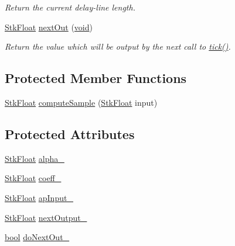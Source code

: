 \begin{DoxyCompactItemize}
\begin{DoxyCompactList}\small\item\em Return the current delay-\/line length. \end{DoxyCompactList}\item 
\hyperlink{namespace_nyq_a044fa20a706520a617bbbf458a7db7e4}{Stk\+Float} \hyperlink{class_nyq_1_1_delay_a_ab83c84ced52c64704f1b7806fef32fb1}{next\+Out} (\hyperlink{sound_8c_ae35f5844602719cf66324f4de2a658b3}{void})
\begin{DoxyCompactList}\small\item\em Return the value which will be output by the next call to \hyperlink{class_nyq_1_1_delay_a1ca7b9275f434e1f1b1808c2dc8b461f}{tick()}. \end{DoxyCompactList}\end{DoxyCompactItemize}
\subsection*{Protected Member Functions}
\begin{DoxyCompactItemize}
\item 
\hyperlink{namespace_nyq_a044fa20a706520a617bbbf458a7db7e4}{Stk\+Float} \hyperlink{class_nyq_1_1_delay_a_a5a666cb576c68f6265cb699cb567b8bf}{compute\+Sample} (\hyperlink{namespace_nyq_a044fa20a706520a617bbbf458a7db7e4}{Stk\+Float} input)
\end{DoxyCompactItemize}
\subsection*{Protected Attributes}
\begin{DoxyCompactItemize}
\item 
\hyperlink{namespace_nyq_a044fa20a706520a617bbbf458a7db7e4}{Stk\+Float} \hyperlink{class_nyq_1_1_delay_a_a943aeaeb73795825f47299b1ebe877ff}{alpha\+\_\+}
\item 
\hyperlink{namespace_nyq_a044fa20a706520a617bbbf458a7db7e4}{Stk\+Float} \hyperlink{class_nyq_1_1_delay_a_a95186d038782182a6f43ac8dd74a3715}{coeff\+\_\+}
\item 
\hyperlink{namespace_nyq_a044fa20a706520a617bbbf458a7db7e4}{Stk\+Float} \hyperlink{class_nyq_1_1_delay_a_a15766be24d5e997df553a6652d052207}{ap\+Input\+\_\+}
\item 
\hyperlink{namespace_nyq_a044fa20a706520a617bbbf458a7db7e4}{Stk\+Float} \hyperlink{class_nyq_1_1_delay_a_a047ba30ea8d274c0fd1b16d92bfe750f}{next\+Output\+\_\+}
\item 
\hyperlink{mac_2config_2i386_2lib-src_2libsoxr_2soxr-config_8h_abb452686968e48b67397da5f97445f5b}{bool} \hyperlink{class_nyq_1_1_delay_a_ae4885215523d063b87446e445a4f9166}{do\+Next\+Out\+\_\+}
\end{DoxyCompactItemize}


